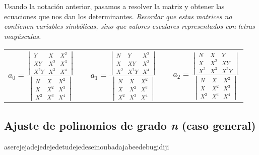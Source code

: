 \documentclass[11pt,letterpaper]{article}
\begin{document}
Usando la notación anterior, pasamos a resolver la matriz y obtener las ecuaciones que nos dan los determinantes. \emph{Recordar que estas matrices no contienen variables simbólicas, sino que valores escalares representados con letras mayúsculas.}
\begin{table}[H] \centering \begin{tabular}{c c c c c}
$a_0 = \frac{
		\begin{vmatrix}
		 	Y &	X	& X^2 \\
		 	XY &	X^2	& X^3 \\
		 	X^2Y & X^3 & X^4	 
		\end{vmatrix}}
		{\begin{vmatrix}
		 	N &	X	& X^2 \\
		 	X &	X^2	& X^3 \\
		 	X^2 & X^3 & X^4	 
		\end{vmatrix}}
		
$ & &
$ a_1 = \frac{
		\begin{vmatrix}
		 	N &	Y	& X^2 \\
		 	X &	XY	& X^3 \\
		 	X^2 & X^2Y & X^4 
		\end{vmatrix}}
		{\begin{vmatrix}
		 	N &	X	& X^2 \\
		 	X &	X^2	& X^3 \\
		 	X^2 & X^3 & X^4	 
		\end{vmatrix}}
$ & &
$ a_2 = \frac{
		\begin{vmatrix}
		 	N &	X	& Y \\
		 	X &	X^2	& XY \\
		 	X^2 & X^3 & X^2Y 
		\end{vmatrix}}
		{\begin{vmatrix}
		 	N &	X	& X^2 \\
		 	X &	X^2	& X^3 \\
		 	X^2 & X^3 & X^4	 
		\end{vmatrix}}
$ \\
\end{tabular} \end{table}


\subsection{Ajuste de polinomios de grado \textit{n}	 (caso general)}
aserejejadejedejedetudejedeseinoubadajabeedebugidiji



\end{document}
